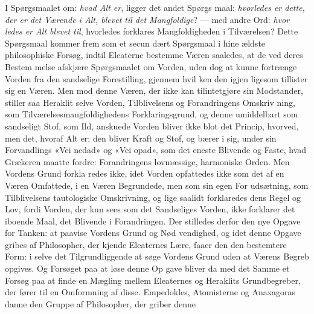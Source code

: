\documentclass[12pt,a4paper]{book}
\begin{document}
I Spørgsmaalet om: \emph{hvad Alt er}, ligger det andet Spørgs\-%
maal: \emph{hvorledes er dette, der er det Værende i Alt,
blevet til det Mangfoldige}? --- med andre Ord: \emph{hvor\-%
ledes er Alt blevet til}, hvorledes forklares Mangfoldigheden
i Tilværelsen? Dette Spørgsmaal kommer frem som et secun\-%
dært Spørgsmaal i hine ældste philosophiske Forsøg, indtil
Eleaterne bestemme Væren saaledes, at de ved deres Bestem\-%
melse afskjære Spørgsmaalet om Vorden, uden dog at kunne
fortrænge Vorden fra den sandselige Forestilling, gjennem hvil\-%
ken den igjen ligesom tillister sig en Væren. Men mod denne
Væren, der ikke kan tilintetgjøre sin Modstander, stiller saa
Heraklit selve Vorden, Tilblivelsens og Forandringens Omskriv\-%
ning, som Tilværelsesmangfoldighedens Forklaringsgrund, og
denne umiddelbart som sandseligt Stof, som Ild, anskuede
Vorden bliver ikke blot det Princip, hvorved, men det, hvoraf
Alt er; den bliver Kraft og Stof, og bærer i sig, under sin
Forvandlings «Vei nedad» og «Vei opad», som det eneste
Blivende og Faste, hvad Grækeren maatte fordre: Forandringens
lovmæssige, harmoniske Orden. Men Vordens Grund forkla\-%
redes ikke, idet Vorden opfattedes ikke som det af en Væren
Omfattede, i en Væren Begrundede, men som sin egen For\-%
udsætning, som Tilblivelsens tautologiske Omskrivning, og lige\-%
saalidt forklaredes dens Regel og Lov, fordi Vorden, der kun
sees som det Sandseliges Vorden, ikke forklarer det iboende
Maal, det Blivende i Forandringen. Der stilledes derfor den
nye Opgave for Tanken: at paavise Vordens Grund og Nød\-%
vendighed, og idet denne Opgave gribes af Philosopher, der
kjende Eleaternes Lære, faaer den den bestemtere Form: i
selve det Tilgrundliggende at søge Vordens Grund uden at
Værens Begreb opgives. Og Forsøget paa at løse denne Op\-%
gave bliver da med det Samme et Forsøg paa at finde en
Mægling mellem Eleaternes og Heraklits Grundbegreber, der
fører til en Omformning af disse. Empedokles, Atomisterne og
Anaxagoras danne den Gruppe af Philosopher, der griber denne
\end{document}

